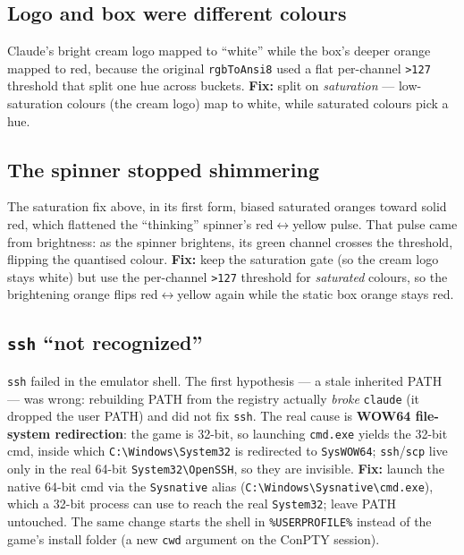 \documentclass[11pt]{article}
\newcommand{\ic}[1]{\texttt{#1}}
\begin{document}
\subsection{Logo and box were different colours}
Claude's bright cream logo mapped to ``white'' while the box's deeper orange mapped to
red, because the original \ic{rgbToAnsi8} used a flat per-channel \ic{>127} threshold that
split one hue across buckets. \textbf{Fix:} split on \emph{saturation} --- low-saturation
colours (the cream logo) map to white, while saturated colours pick a hue.

\subsection{The spinner stopped shimmering}
\label{sec:shimmer}
The saturation fix above, in its first form, biased saturated oranges toward solid red,
which flattened the ``thinking'' spinner's red$\leftrightarrow$yellow pulse. That pulse
came from brightness: as the spinner brightens, its green channel crosses the threshold,
flipping the quantised colour. \textbf{Fix:} keep the saturation gate (so the cream logo
stays white) but use the per-channel \ic{>127} threshold for \emph{saturated} colours, so
the brightening orange flips red$\leftrightarrow$yellow again while the static box orange
stays red.

\subsection{\texttt{ssh} ``not recognized''}
\label{sec:ssh}
\texttt{ssh} failed in the emulator shell. The first hypothesis --- a stale inherited
PATH --- was wrong: rebuilding PATH from the registry actually \emph{broke} \texttt{claude}
(it dropped the user PATH) and did not fix \texttt{ssh}. The real cause is
\textbf{WOW64 file-system redirection}: the game is 32-bit, so launching \texttt{cmd.exe}
yields the 32-bit cmd, inside which \texttt{C:\textbackslash Windows\textbackslash System32}
is redirected to \texttt{SysWOW64}; \texttt{ssh}/\texttt{scp} live only in the real
64-bit \texttt{System32\textbackslash OpenSSH}, so they are invisible. \textbf{Fix:}
launch the native 64-bit cmd via the \texttt{Sysnative} alias
(\ic{C:\textbackslash Windows\textbackslash Sysnative\textbackslash cmd.exe}), which a 32-bit process can use to reach the real
\texttt{System32}; leave PATH untouched. The same change starts the shell in
\ic{\%USERPROFILE\%} instead of the game's install folder (a new \ic{cwd} argument on the
ConPTY session).
\end{document}
